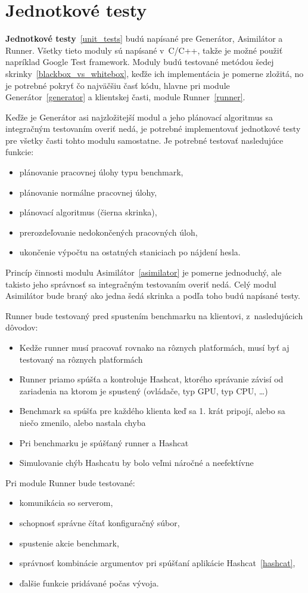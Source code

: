 \section{Jednotkové testy}
\textbf{Jednotkové testy}~\ref{unit_tests} budú napísané pre Generátor, Asimilátor a Runner.
Všetky tieto moduly sú napísané v~C/C++, takže je možné použiť napríklad Google Test framework.
Moduly budú testované metódou šedej skrinky~\ref{blackbox_vs_whitebox}, keďže ich implementácia je pomerne zložitá, no je potrebné pokryť čo najväčšiu časť kódu, hlavne pri module Generátor~\ref{generator} a klientskej časti, module Runner~\ref{runner}.

Keďže je Generátor asi najzložitejší modul a jeho plánovací algoritmus sa integračným testovaním overiť nedá, je potrebné implementovať jednotkové testy pre všetky časti tohto modulu samostatne.
Je potrebné testovať nasledujúce funkcie:
\begin{itemize}
	\item plánovanie pracovnej úlohy typu benchmark,
	\item plánovanie normálne pracovnej úlohy,
	\item plánovací algoritmus (čierna skrinka),
	\item prerozdeľovanie nedokončených pracovných úloh,
	\item ukončenie výpočtu na ostatných staniciach po nájdení hesla.
\end{itemize}

Princíp činnosti modulu Asimilátor~\ref{asimilator} je pomerne jednoduchý, ale takisto jeho správnosť sa integračným testovaním overiť nedá.
Celý modul Asimilátor bude braný ako jedna šedá skrinka a podľa toho budú napísané testy.

Runner bude testovaný pred spustením benchmarku na klientovi, z~nasledujúcich dôvodov:
\begin{itemize}
\item Kedže runner musí pracovať rovnako na rôznych platformách, musí byť aj testovaný na rôznych platformách
\item Runner priamo spúšťa a kontroluje Hashcat, ktorého správanie závisí od zariadenia na ktorom je spustený (ovládače, typ GPU, typ CPU, …)
\item Benchmark sa spúšťa pre každého klienta keď sa 1.
krát pripojí, alebo sa niečo zmenilo, alebo nastala chyba
\item Pri benchmarku je spúšťaný runner a Hashcat
\item Simulovanie chýb Hashcatu by bolo veľmi náročné a neefektívne 
\end{itemize}
Pri module Runner bude testované:
\begin{itemize}
	\item komunikácia so serverom,
	\item schopnosť správne čítať konfiguračný súbor,
	\item spustenie akcie benchmark,
	\item správnosť kombinácie argumentov pri spúšťaní aplikácie Hashcat~\ref{hashcat},
	\item ďalšie funkcie pridávané počas vývoja.
\end{itemize}

